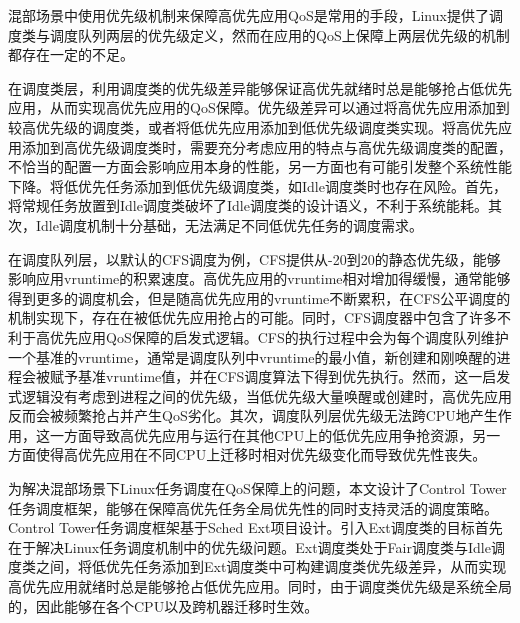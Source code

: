 
混部场景中使用优先级机制来保障高优先应用QoS是常用的手段，Linux提供了调度类与调度队列两层的优先级定义，然而在应用的QoS上保障上两层优先级的机制都存在一定的不足。

在调度类层，利用调度类的优先级差异能够保证高优先就绪时总是能够抢占低优先应用，从而实现高优先应用的QoS保障。优先级差异可以通过将高优先应用添加到较高优先级的调度类，或者将低优先应用添加到低优先级调度类实现。将高优先应用添加到高优先级调度类时，需要充分考虑应用的特点与高优先级调度类的配置，不恰当的配置一方面会影响应用本身的性能，另一方面也有可能引发整个系统性能下降。将低优先任务添加到低优先级调度类，如Idle调度类时也存在风险。首先，将常规任务放置到Idle调度类破坏了Idle调度类的设计语义，不利于系统能耗。其次，Idle调度机制十分基础，无法满足不同低优先任务的调度需求。

在调度队列层，以默认的CFS调度为例，CFS提供从-20到20的静态优先级，能够影响应用vruntime的积累速度。高优先应用的vruntime相对增加得缓慢，通常能够得到更多的调度机会，但是随高优先应用的vruntime不断累积，在CFS公平调度的机制实现下，存在在被低优先应用抢占的可能。同时，CFS调度器中包含了许多不利于高优先应用QoS保障的启发式逻辑。CFS的执行过程中会为每个调度队列维护一个基准的vruntime，通常是调度队列中vruntime的最小值，新创建和刚唤醒的进程会被赋予基准vruntime值，并在CFS调度算法下得到优先执行。然而，这一启发式逻辑没有考虑到进程之间的优先级，当低优先级大量唤醒或创建时，高优先应用反而会被频繁抢占并产生QoS劣化。其次，调度队列层优先级无法跨CPU地产生作用，这一方面导致高优先应用与运行在其他CPU上的低优先应用争抢资源，另一方面使得高优先应用在不同CPU上迁移时相对优先级变化而导致优先性丧失。

为解决混部场景下Linux任务调度在QoS保障上的问题，本文设计了Control Tower任务调度框架，能够在保障高优先任务全局优先性的同时支持灵活的调度策略。Control Tower任务调度框架基于Sched Ext项目设计。引入Ext调度类的目标首先在于解决Linux任务调度机制中的优先级问题。Ext调度类处于Fair调度类与Idle调度类之间，将低优先任务添加到Ext调度类中可构建调度类优先级差异，从而实现高优先应用就绪时总是能够抢占低优先应用。同时，由于调度类优先级是系统全局的，因此能够在各个CPU以及跨机器迁移时生效。

